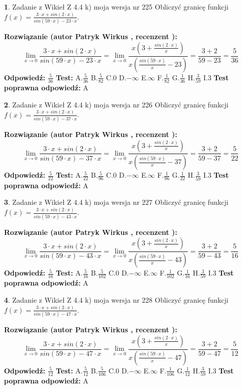 \documentclass[12pt, a4paper]{article}
\theoremstyle{definition} %
\newtheorem{zad}{}
\newcommand{\zadStart}[1]{\begin{zad}#1\newline}
\newcommand{\zadStop}{\end{zad}}
\newcommand{\rozwStart}[2]{\noindent \textbf{Rozwiązanie (autor #1 , recenzent #2): }\newline}
\newcommand{\rozwStop}{\newline}
\newcommand{\odpStart}{\noindent \textbf{Odpowiedź:}\newline}
\newcommand{\odpStop}{\newline}
\newcommand{\testStart}{\noindent \textbf{Test:}\newline}
\newcommand{\testStop}{\newline}
\newcommand{\kluczStart}{\noindent \textbf{Test poprawna odpowiedź:}\newline}
\newcommand{\kluczStop}{\newline}
\begin{document}
\zadStart{Zadanie z Wikieł Z 4.4 k) moja wersja nr 225}
Obliczyć granicę funkcji $f(x)=\frac{3\cdot x +sin(2\cdot x)}{sin(59\cdot x) -23\cdot x}$.
\zadStop
\rozwStart{Patryk Wirkus}{}
$$\lim\limits_{x\to 0}\frac{3\cdot x +sin(2\cdot x)}{sin(59\cdot x) -23\cdot x}
=\lim\limits_{x\to 0}\frac{x(3+\frac{sin(2\cdot x)}{x})}{x(\frac{sin(59\cdot x)}{x}-23)}
=\frac{3+2}{59-23} = \frac{5}{36}$$
\rozwStop
\odpStart
$\frac{5}{36}$
\odpStop
\testStart
A.$\frac{5}{36}$
B.$\frac{5}{82}$
C.$0$
D.$-\infty$
E.$\infty$
F.$\frac{1}{82}$
G.$\frac{1}{36}$
H.$\frac{3}{59}$
I.$3$
\testStop
\kluczStart
A
\kluczStop



\zadStart{Zadanie z Wikieł Z 4.4 k) moja wersja nr 226}
Obliczyć granicę funkcji $f(x)=\frac{3\cdot x +sin(2\cdot x)}{sin(59\cdot x) -37\cdot x}$.
\zadStop
\rozwStart{Patryk Wirkus}{}
$$\lim\limits_{x\to 0}\frac{3\cdot x +sin(2\cdot x)}{sin(59\cdot x) -37\cdot x}
=\lim\limits_{x\to 0}\frac{x(3+\frac{sin(2\cdot x)}{x})}{x(\frac{sin(59\cdot x)}{x}-37)}
=\frac{3+2}{59-37} = \frac{5}{22}$$
\rozwStop
\odpStart
$\frac{5}{22}$
\odpStop
\testStart
A.$\frac{5}{22}$
B.$\frac{5}{96}$
C.$0$
D.$-\infty$
E.$\infty$
F.$\frac{1}{96}$
G.$\frac{1}{22}$
H.$\frac{3}{59}$
I.$3$
\testStop
\kluczStart
A
\kluczStop



\zadStart{Zadanie z Wikieł Z 4.4 k) moja wersja nr 227}
Obliczyć granicę funkcji $f(x)=\frac{3\cdot x +sin(2\cdot x)}{sin(59\cdot x) -43\cdot x}$.
\zadStop
\rozwStart{Patryk Wirkus}{}
$$\lim\limits_{x\to 0}\frac{3\cdot x +sin(2\cdot x)}{sin(59\cdot x) -43\cdot x}
=\lim\limits_{x\to 0}\frac{x(3+\frac{sin(2\cdot x)}{x})}{x(\frac{sin(59\cdot x)}{x}-43)}
=\frac{3+2}{59-43} = \frac{5}{16}$$
\rozwStop
\odpStart
$\frac{5}{16}$
\odpStop
\testStart
A.$\frac{5}{16}$
B.$\frac{5}{102}$
C.$0$
D.$-\infty$
E.$\infty$
F.$\frac{1}{102}$
G.$\frac{1}{16}$
H.$\frac{3}{59}$
I.$3$
\testStop
\kluczStart
A
\kluczStop



\zadStart{Zadanie z Wikieł Z 4.4 k) moja wersja nr 228}
Obliczyć granicę funkcji $f(x)=\frac{3\cdot x +sin(2\cdot x)}{sin(59\cdot x) -47\cdot x}$.
\zadStop
\rozwStart{Patryk Wirkus}{}
$$\lim\limits_{x\to 0}\frac{3\cdot x +sin(2\cdot x)}{sin(59\cdot x) -47\cdot x}
=\lim\limits_{x\to 0}\frac{x(3+\frac{sin(2\cdot x)}{x})}{x(\frac{sin(59\cdot x)}{x}-47)}
=\frac{3+2}{59-47} = \frac{5}{12}$$
\rozwStop
\odpStart
$\frac{5}{12}$
\odpStop
\testStart
A.$\frac{5}{12}$
B.$\frac{5}{106}$
C.$0$
D.$-\infty$
E.$\infty$
F.$\frac{1}{106}$
G.$\frac{1}{12}$
H.$\frac{3}{59}$
I.$3$
\testStop
\kluczStart
A
\kluczStop
\end{document}
